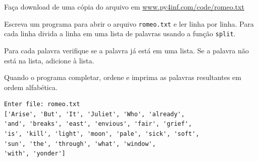 \begin{ex}
Faça download de uma cópia do arquivo em
\url{www.py4inf.com/code/romeo.txt}

Escreva um programa para abrir o arquivo {\tt romeo.txt}
e ler linha por linha. Para cada linha divida a linha em uma lista
de palavras usando a função {\tt split}.

Para cada palavra verifique se a palavra já está em uma lista.
Se a palavra não está na lista, adicione à lista.

Quando o programa completar, ordene e imprima as palavras resultantes
em ordem alfabética.

\begin{verbatim}
Enter file: romeo.txt
['Arise', 'But', 'It', 'Juliet', 'Who', 'already', 
'and', 'breaks', 'east', 'envious', 'fair', 'grief', 
'is', 'kill', 'light', 'moon', 'pale', 'sick', 'soft', 
'sun', 'the', 'through', 'what', 'window', 
'with', 'yonder']
\end{verbatim}
\end{ex}

